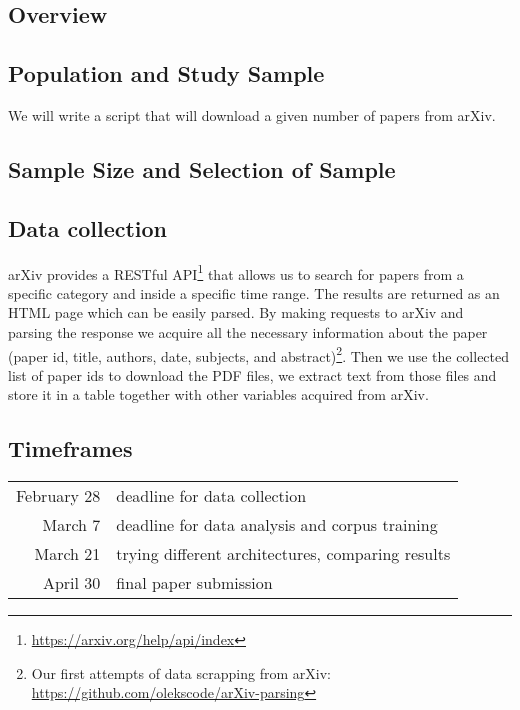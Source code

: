\documentclass[sigplan]{acmart}
\begin{document}
\subsection{Overview}

\subsection{Population and Study Sample}

We will write a script that will download a given number of papers from arXiv. 

\subsection{Sample Size and Selection of Sample}
\subsection{Data collection}

arXiv provides a RESTful API\footnote{\url{https://arxiv.org/help/api/index}} that allows us to search for papers from a specific category and inside a specific time range. The results are returned as an HTML page which can be easily parsed. By making requests to arXiv and parsing the response we acquire all the necessary information about the paper (paper id, title, authors, date, subjects, and abstract)\footnote{Our first attempts of data scrapping from arXiv:\\ \url{https://github.com/olekscode/arXiv-parsing}}. Then we use the collected list of paper ids to download the PDF files, we extract text from those files and store it in a table together with other variables acquired from arXiv.

\subsection{Timeframes}

\begin{center}
\begin{tabular}{ r | l }
 February 28 & deadline for data collection \\ 
 March 7 & deadline for data analysis and corpus training \\  
 March 21 & trying different architectures, comparing results \\
 April 30 & final  paper submission
\end{tabular}
\end{center}
\end{document}
